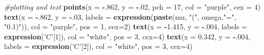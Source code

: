 \documentclass[]{article}
\newenvironment{Shaded}{\begin{snugshade}}{\end{snugshade}}
\newcommand{\KeywordTok}[1]{\textcolor[rgb]{0.13,0.29,0.53}{\textbf{#1}}}
\newcommand{\DataTypeTok}[1]{\textcolor[rgb]{0.13,0.29,0.53}{#1}}
\newcommand{\DecValTok}[1]{\textcolor[rgb]{0.00,0.00,0.81}{#1}}
\newcommand{\FloatTok}[1]{\textcolor[rgb]{0.00,0.00,0.81}{#1}}
\newcommand{\StringTok}[1]{\textcolor[rgb]{0.31,0.60,0.02}{#1}}
\newcommand{\CommentTok}[1]{\textcolor[rgb]{0.56,0.35,0.01}{\textit{#1}}}
\newcommand{\OperatorTok}[1]{\textcolor[rgb]{0.81,0.36,0.00}{\textbf{#1}}}
\newcommand{\NormalTok}[1]{#1}
\begin{document}
\begin{Shaded}
\begin{Highlighting}[]
\CommentTok{#plotting and text}
\KeywordTok{points}\NormalTok{(}\DataTypeTok{x =} \OperatorTok{-}\NormalTok{.}\DecValTok{862}\NormalTok{, }\DataTypeTok{y =} \OperatorTok{-}\NormalTok{.}\DecValTok{02}\NormalTok{, }\DataTypeTok{pch =} \DecValTok{17}\NormalTok{, }\DataTypeTok{col =} \StringTok{"purple"}\NormalTok{, }\DataTypeTok{cex =} \DecValTok{4}\NormalTok{)}
\KeywordTok{text}\NormalTok{(}\DataTypeTok{x =}  \OperatorTok{-}\NormalTok{.}\DecValTok{862}\NormalTok{, }\DataTypeTok{y =} \OperatorTok{-}\NormalTok{.}\DecValTok{03}\NormalTok{, }\DataTypeTok{labels =} \KeywordTok{expression}\NormalTok{(}\KeywordTok{paste}\NormalTok{(mu, }\StringTok{"("}\NormalTok{, omega,}\StringTok{"="}\NormalTok{, }\StringTok{"0.1)"}\NormalTok{)), }\DataTypeTok{col =} \StringTok{"purple"}\NormalTok{, }\DataTypeTok{pos =} \DecValTok{1}\NormalTok{, }\DataTypeTok{cex=}\DecValTok{2}\NormalTok{)}
\KeywordTok{text}\NormalTok{(}\DataTypeTok{x =}  \OperatorTok{-}\FloatTok{1.415}\NormalTok{, }\DataTypeTok{y =} \OperatorTok{-}\NormalTok{.}\DecValTok{004}\NormalTok{, }\DataTypeTok{labels =} \KeywordTok{expression}\NormalTok{(}\StringTok{'C'}\NormalTok{[}\DecValTok{1}\NormalTok{]), }\DataTypeTok{col =} \StringTok{"white"}\NormalTok{, }\DataTypeTok{pos =} \DecValTok{3}\NormalTok{, }\DataTypeTok{cex=}\DecValTok{4}\NormalTok{)}
\KeywordTok{text}\NormalTok{(}\DataTypeTok{x =}  \FloatTok{0.342}\NormalTok{, }\DataTypeTok{y =} \OperatorTok{-}\NormalTok{.}\DecValTok{004}\NormalTok{, }\DataTypeTok{labels =} \KeywordTok{expression}\NormalTok{(}\StringTok{'C'}\NormalTok{[}\DecValTok{2}\NormalTok{]), }\DataTypeTok{col =} \StringTok{"white"}\NormalTok{, }\DataTypeTok{pos =} \DecValTok{3}\NormalTok{, }\DataTypeTok{cex=}\DecValTok{4}\NormalTok{)}
\end{Highlighting}
\end{Shaded}
\end{document}
